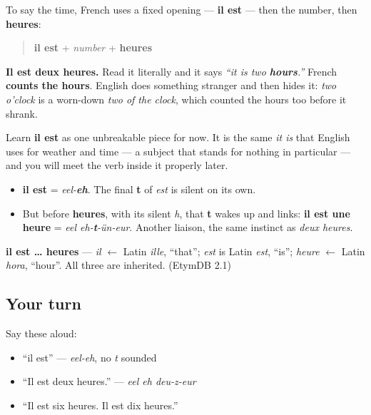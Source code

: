 \begin{grammarlens}[title={Grammar Lens: French counts the hours}]
To say the time, French uses a fixed opening — \textbf{il est} — then the number, then \textbf{heures}:

\begin{quote}
\textbf{il est} + \emph{number} + \textbf{heures}
\end{quote}

\textbf{Il est deux heures.} Read it literally and it says \emph{\textquotedblleft{}it is two \textbf{hours}.\textquotedblright{}} French \textbf{counts the hours}. English does something stranger and then hides it: \emph{two o'clock} is a worn-down \emph{two of the clock}, which counted the hours too before it shrank.

Learn \textbf{il est} as one unbreakable piece for now. It is the same \emph{it is} that English uses for weather and time — a subject that stands for nothing in particular — and you will meet the verb inside it properly later.
\end{grammarlens}

\begin{sounds}
\begin{itemize}
\raggedright
  \item \textbf{il est} = \emph{eel-\textbf{eh}}. The final \textbf{t} of \emph{est} is silent on its own.
  \item But before \textbf{heures}, with its silent \emph{h}, that \textbf{t} wakes up and links: \textbf{il est une heure} = \emph{eel eh-\textbf{t}-ün-eur}. Another liaison, the same instinct as \emph{deux heures}.
\end{itemize}
\end{sounds}

\begin{cousinweb}
\textbf{il est … heures} — \emph{il} $\leftarrow$ Latin \emph{ille}, \textquotedblleft{}that\textquotedblright{}; \emph{est} is Latin \emph{est}, \textquotedblleft{}is\textquotedblright{}; \emph{heure} $\leftarrow$ Latin \emph{hora}, \textquotedblleft{}hour\textquotedblright{}. All three are inherited. (EtymDB 2.1)
\end{cousinweb}

\subsection*{Your turn}
Say these aloud:

\begin{itemize}
\raggedright
  \item \textquotedblleft{}il est\textquotedblright{} — \emph{eel-eh}, no \emph{t} sounded
  \item \textquotedblleft{}Il est deux heures.\textquotedblright{} — \emph{eel eh deu-z-eur}
  \item \textquotedblleft{}Il est six heures. Il est dix heures.\textquotedblright{}
\end{itemize}

